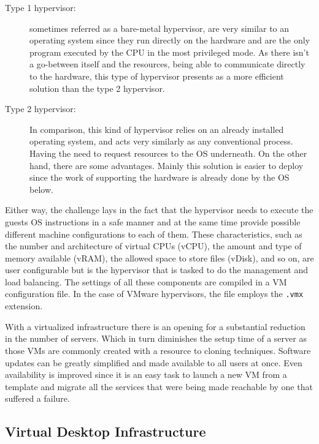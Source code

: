 \begin{description}
	\item [Type 1 hypervisor:] sometimes referred as a bare-metal hypervisor, are very similar to an operating system since they run directly on the hardware and are the only program executed by the CPU in the most privileged mode. As there isn't a go-between itself and the resources, being able to communicate directly to the hardware, this type of hypervisor presents as a more efficient solution than the type 2 hypervisor.
	\item [Type 2 hypervisor:] In comparison, this kind of hypervisor relies on an already installed operating system, and acts very similarly as any conventional process. Having the need to request resources to the OS underneath. On the other hand, there are some advantages. Mainly this solution is easier to deploy since the work of supporting the hardware is already done by the OS below.
\end{description}

Either way, the challenge lays in the fact that the hypervisor needs to execute the guests OS instructions in a safe manner and at the same time provide possible different machine configurations to each of them. These characteristics, such as the number and architecture of virtual CPUs (vCPU), the amount and type of memory available (vRAM), the allowed space to store files (vDisk), and so on, are user configurable but is the hypervisor that is tasked to do the management and load balancing. The settings of all these components are compiled in a VM configuration file. In the case of VMware hypervisors, the file employs the \texttt{.vmx} extension.\cite{VMWare_VMFiles,Portnoy2012}

With a virtualized infrastructure there is an opening for a substantial reduction in the number of servers. Which in turn diminishes the setup time of a server as those VMs are commonly created with a resource to cloning techniques. Software updates can be greatly simplified and made available to all users at once. Even availability is improved since it is an easy task to launch a new VM from a template and migrate all the services that were being made reachable by one that suffered a failure. 




\subsection{Virtual Desktop Infrastructure} %
\label{sub:vdi}


